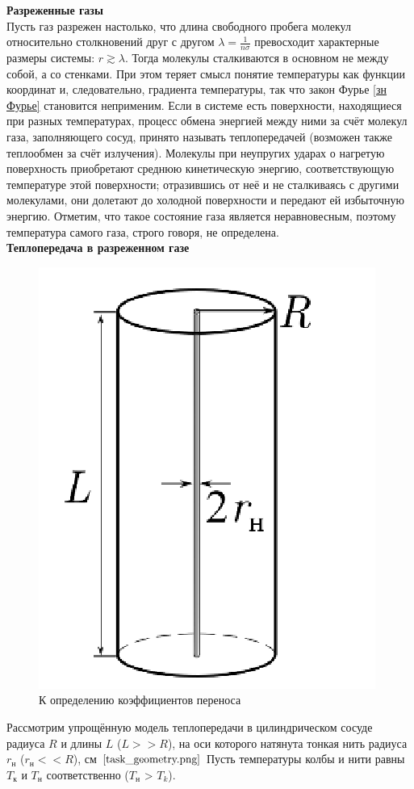 \documentclass[12pt]{article}
\begin{document}
        \textbf{Разреженные газы}\\
         Пусть газ разрежен настолько, что длина свободного пробега молекул относительно столкновений друг 
        с другом $\lambda = \frac{1}{n\sigma}$ превосходит характерные размеры системы: $r \gtrsim \lambda$. Тогда молекулы 
        сталкиваются в основном не между собой, а со стенками. При этом теряет смысл понятие
        температуры как функции координат и, следовательно, градиента температуры, так что закон Фурье \ref{зн Фурье} 
        становится неприменим. Если в системе есть поверхности, находящиеся при разных температурах, процесс обмена энергией 
        между ними за счёт молекул газа, заполняющего сосуд, принято называть теплопередачей (возможен также теплообмен за счёт излучения). Молекулы 
        при неупругих ударах о нагретую поверхность приобретают среднюю
        кинетическую энергию, соответствующую температуре этой поверхности;
        отразившись от неё и не сталкиваясь с другими молекулами, они долетают до
        холодной поверхности и передают ей избыточную энергию. Отметим, что такое состояние газа является неравновесным, поэтому
        температура самого газа, строго говоря, не определена.\\
        \textbf{Теплопередача в разреженном газе}\\
        \begin{figure}[H]
            \centering
            \includegraphics[width=0.4\linewidth]{task_geometry.png}
            \caption{К определению коэффициентов переноса}
            \label{fig:mpr}
        \end{figure}
        Рассмотрим упрощённую модель теплопередачи в цилиндрическом сосуде радиуса $R$ и длины $L$ ($L >>R$),
        на оси которого натянута тонкая нить радиуса $r_\text{н}$ ($r_\text{н} << R$), см $\ref{task_geometry.png}$
        Пусть температуры колбы и нити равны $T_\text{к}$ и $T_\text{н}$ соответственно ($T_\text{н}$ > $T_k$). 
\end{document}
